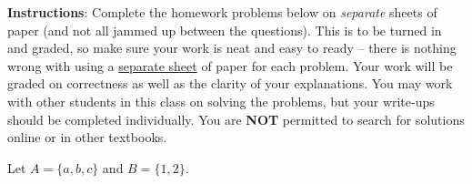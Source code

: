 \documentclass[10pt]{exam}
\begin{document}
\noindent \textbf{Instructions}: Complete the homework problems below on {\em separate} sheets of paper (and not all jammed up between the questions).  This is to be turned in and graded, so make sure your work is neat and easy to ready -- there is nothing wrong with using a \underline{separate sheet} of paper for each problem. Your work will be graded on correctness as well as the clarity of your explanations.  You may work with other students in this class on solving the problems, but your write-ups should be completed individually.  You are \textbf{NOT} permitted to search for solutions online or in other textbooks.

\begin{questions}

\question[4] Let $A = \{a,b,c\}$ and $B = \{1,2\}$.
\begin{parts}

\end{parts}
\end{questions}
\end{document}
